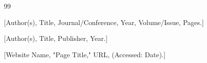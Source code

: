 \documentclass[a4paper, 12pt, twoside]{article}
\begin{document}
\begin{thebibliography}{99}

[Author(s), Title, Journal/Conference, Year, Volume/Issue, Pages.]

[Author(s), Title, Publisher, Year.]

[Website Name, "Page Title," URL, (Accessed: Date).]

\end{thebibliography}
\end{document}
